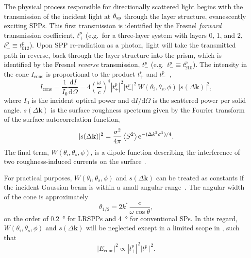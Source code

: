 The physical process responsible for directionally scattered light begins
with the transmission of the incident light at $\theta_\mathrm{sp}$ through the layer
structure, evanescently exciting SPPs.  This first transmission is
identified by the Fresnel \textit{forward} transmission coefficient,
$t^p_+$ (e.g.\ for a three-layer system with layers 0, 1, and 2, $t^p_+
\equiv t^p_{012}$).  Upon SPP re-radiation as a photon, light will take the
transmitted path in reverse, back through the layer structure into the
prism, which is identified by the Fresnel \textit{reverse} transmission,
$t^p_-$ (e.g.\  $t^p_- \equiv t^p_{210}$).  The intensity in the cone
$I_\mathrm{cone}$ is proportional to the product $t^p_+$ and $t^p_-$~\cite{simon1976directional},
\begin{equation}
  I_\mathrm{cone}
  = \frac{1}{I_0}\frac{\mathrm{d}I}{\mathrm{d}\Omega}
  = 4 {\left(\frac{\omega}{c}\right)}^4 |t^p_+|^2
  |t^p_-|^2\,W(\theta_i,\theta_s,\phi)\, |s(\Delta \mathbf{k})|^2
  \label{eqn:guhacone},
\end{equation}
where $I_0$ is the incident optical power and
$\mathrm{d}I/\mathrm{d}\Omega$ is the scattered power per solid angle.
$s(\Delta \mathbf{k})$ is the surface roughness spectrum given by the Fourier
transform of the surface autocorrelation function,
\begin{equation}
  |s(\Delta \mathbf{k})|^2 = \frac{\sigma^2}{4\pi} \left<S^2\right>
  {\mathrm{e}}^{-(\Delta k^2 \sigma^2)/4}.
  \label{eqn:surfaceroughness}
\end{equation}
The final term, $W(\theta_i,\theta_s,\phi)$, is a dipole function describing
the interference of two roughness-induced currents on the
surface~\cite{raether1997surface}.

For practical purposes, $W(\theta_i,\theta_s,\phi)$ and $s(\Delta
\mathbf{k})$ can be treated as constants if the incident Gaussian beam is
within a small angular range~\cite{heitmann1977determination}.  The angular
width of the cone is approximately
\begin{equation}
  \theta_{1/2} = 2 k^{\prime\prime} \frac{c}{\omega \cos \theta},
\end{equation}
on the order of \SI{0.2}{\degree} for LRSPPs and \SI{4}{\degree} for
conventional SPs.  In this regard, $W(\theta_i,\theta_s,\phi)$ and
$s(\Delta \mathbf{k})$ will be neglected
except in a limited scope in , such that
\begin{equation}
  |E_\mathrm{cone}|^2 \propto |t^p_+|^2 |t^p_-|^2.
  \label{eqn:conefield}
\end{equation}

